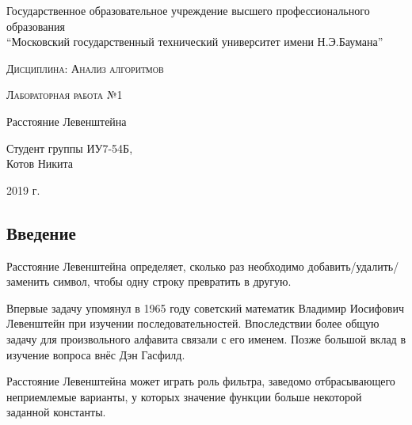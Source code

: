 \documentclass[a4paper,12pt]{article}
\begin{document}
    \begin{titlepage}

        \begin{center}
            \large
            Государственное образовательное учреждение высшего профессионального образования\\
            “Московский государственный технический университет имени Н.Э.Баумана”
            \vspace{3cm}
            
            \textsc{Дисциплина: Анализ алгоритмов}
            \vspace{0.5cm}
                
            \textsc{Лабораторная работа №1}
            \vspace{3cm}
            
            {\LARGE Расстояние Левенштейна}
            \vspace{3cm}
            
            Студент группы ИУ7-54Б,\\   
            Котов Никита
            \vfill
            
            2019 г.
            
            \end{center}
    \end{titlepage}
    
    \begin{center}
    	\tableofcontents
    \end{center}
	
	\setcounter{page}{2}
	\newpage
    \begin{center}
        \section*{Введение}
    \end{center}
        \label{sec:intro}
\qquad Расстояние Левенштейна определяет, сколько раз необходимо добавить/удалить/заменить символ, чтобы одну строку превратить в другую.
        
Впервые задачу упомянул в 1965 году советский математик Владимир Иосифович Левенштейн при изучении последовательностей\cite{litlink5}. Впоследствии более общую задачу для произвольного алфавита связали с его именем. Позже большой вклад в изучение вопроса внёс Дэн Гасфилд.

Расстояние Левенштейна может играть роль фильтра, заведомо отбрасывающего неприемлемые варианты, у которых значение функции больше некоторой заданной константы.
\end{document}
